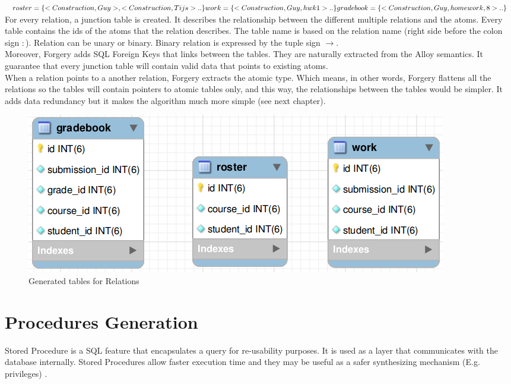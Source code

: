 \documentclass[oneside]{book}
\begin{document}
\noindent$roster = \{<Construction, Guy>, <Construction, Tijs>..\}\\
work = \{<Construction, Guy, hwk1>.. \}\\
gradebook = \{<Construction, Guy, homework, 8> ..\}$\\

\noindent For every relation, a junction table is created. It describes the relationship between the different multiple relations and the atoms.
Every table contains the ids of the atoms that the relation describes. The table name is based on the relation name (right side before the colon sign $:$). Relation can be unary or binary. Binary relation is expressed by the tuple sign $\rightarrow$.\\

\noindent Moreover, Forgery adds SQL Foreign Keys that links between the tables. They are naturally extracted from the Alloy semantics. It guarantee that every junction table will contain valid data that points to existing atoms.\\

\noindent When a relation points to a another relation, Forgery extracts the atomic type. Which means, in other words, Forgery flattens all the relations so the tables will contain pointers to atomic tables only, and this way, the relationships between the tables would be simpler. It adds data redundancy but it makes the algorithm much more simple (see next chapter).

\begin{figure}[h!]
\centering
\includegraphics[scale=0.5]{2}
\caption{Generated tables for Relations}
\end{figure}

\newpage
\section{Procedures Generation}

\noindent Stored Procedure is a SQL feature that encapsulates a query for re-usability purposes. It is used as a layer that communicates with the database internally. Stored Procedures allow faster execution time and they may be useful as a safer synthesizing mechanism (E.g. privileges) \cite{when}.\\
\end{document}
